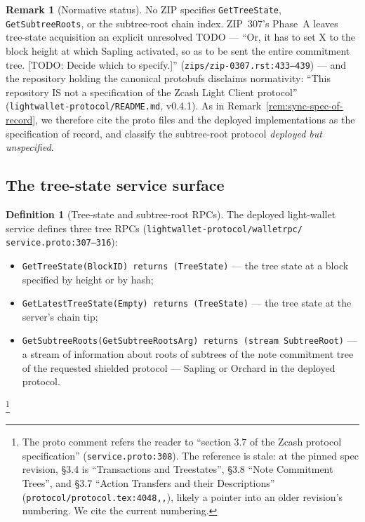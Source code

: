 \documentclass[11pt,a4paper]{article}
\theoremstyle{definition}
\newtheorem{definition}[theorem]{Definition}
\newtheorem{remark}[theorem]{Remark}
\begin{document}
\begin{remark}[Normative status]\label{rem:sync-tree-normative}
No ZIP specifies \texttt{GetTreeState}, \texttt{GetSubtreeRoots}, or the
subtree-root chain index. ZIP~307's Phase~A leaves tree-state acquisition
an explicit unresolved TODO --- ``Or, it has to set X to the block height
at which Sapling activated, so as to be sent the entire commitment tree.
[TODO: Decide which to specify.]''
(\texttt{zips/zip-0307.rst:433--439}) --- and the repository holding the
canonical protobufs disclaims normativity: ``This repository IS not a
specification of the Zcash Light Client protocol''
(\texttt{lightwallet-protocol/README.md}, v0.4.1). As in
Remark~\ref{rem:sync-spec-of-record}, we therefore cite the proto files
and the deployed implementations as the specification of record, and
classify the subtree-root protocol \emph{deployed but unspecified}.
\end{remark}

\subsection{The tree-state service surface}\label{sec:sync-tree-rpcs}

\begin{definition}[Tree-state and subtree-root RPCs]\label{def:sync-tree-rpcs}
The deployed light-wallet service defines three tree RPCs
(\texttt{lightwallet-protocol/walletrpc/}\allowbreak
\texttt{service.proto:307--316}):
\begin{itemize}
\item \texttt{GetTreeState(BlockID) returns (TreeState)} --- the tree
  state at a block specified by height or by hash;
\item \texttt{GetLatestTreeState(Empty) returns (TreeState)} --- the
  tree state at the server's chain tip;
\item \texttt{GetSubtreeRoots(GetSubtreeRootsArg) returns (stream
  SubtreeRoot)} --- a stream of information about roots of subtrees of
  the note commitment tree of the requested shielded protocol ---
  Sapling or Orchard in the deployed protocol.
\end{itemize}%
\footnote{The proto comment refers the reader to ``section 3.7 of the
Zcash protocol specification''
(\texttt{service.proto:308}). The reference is stale: at the pinned spec
revision, \S3.4 is ``Transactions and Treestates'', \S3.8 ``Note
Commitment Trees'', and \S3.7 ``Action Transfers and their
Descriptions''
(\texttt{protocol/protocol.tex:4048,,}),
likely a
pointer into an older revision's numbering. We cite the current
numbering.}
\end{definition}
\end{document}
